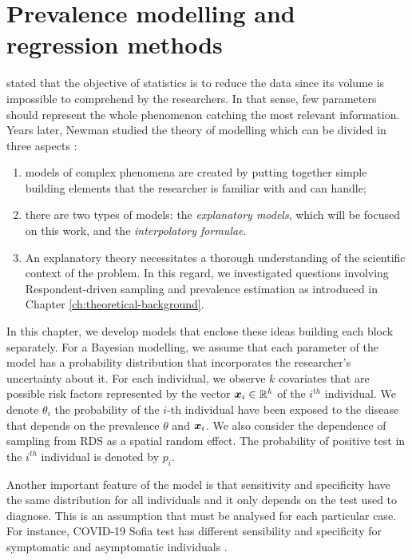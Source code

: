 \chapter{Prevalence modelling and regression methods}

\textcite[p. 311]{fisher1922mathematical} stated that the objective of
statistics is to reduce the data since its volume is impossible 
to comprehend by the researchers. In that sense, few parameters should represent the whole phenomenon catching the most relevant information. 
Years later, Newman studied the theory of modelling which can be divided 
in three aspects \cite[p. 161]{lehmann2012model}: 

\begin{enumerate}
  \item models of complex phenomena are created by putting together 
  simple building elements that the researcher is familiar with and can 
  handle; 
  \item there are two types of models: the \textit{explanatory models}, 
  which will be focused on this work, and the \textit{interpolatory formulae}. 
  \item An explanatory theory necessitates a thorough understanding of the scientific context of the problem. In this regard, we investigated questions involving Respondent-driven sampling and prevalence estimation as introduced in Chapter \ref{ch:theoretical-background}. 
\end{enumerate}

In this chapter, we develop models that enclose these ideas building each 
block separately. For a Bayesian modelling, we assume that each parameter
of the model has a probability distribution that incorporates the 
researcher's uncertainty about it. For each individual, we observe $k$ 
covariates that are possible risk factors represented by the vector 
$\boldsymbol{x}_i \in \mathbb{R}^{k}$ of the $i^{th}$ individual. We denote $\theta_i$ the 
probability of the $i$-th individual have been exposed to the disease
that depends on the prevalence $\theta$ and $\boldsymbol{x}_i$. We also consider the
dependence of sampling from RDS as a spatial random effect. The probability of
positive test in the $i^{th}$ individual is denoted by $p_i$.  

Another important feature of the model is that sensitivity and 
specificity have the same distribution for all individuals and 
it only depends on the test used to diagnose. This is an assumption 
that must be analysed for each particular case. For instance, COVID-19 
Sofia test has different sensibility and specificity for symptomatic and 
asymptomatic individuals \cite[Table 1][p. 3]{mitchell2021performance}.  

